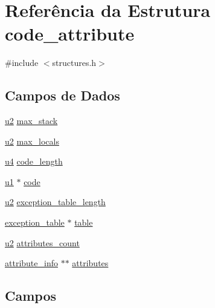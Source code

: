 \hypertarget{structcode__attribute}{}\section{Referência da Estrutura code\+\_\+attribute}
\label{structcode__attribute}


{\ttfamily \#include $<$structures.\+h$>$}

\subsection*{Campos de Dados}
\begin{DoxyCompactItemize}
\item 
\hyperlink{lista__operandos_8h_a732cde1300aafb73b0ea6c2558a7a54f}{u2} \hyperlink{structcode__attribute_abd4d398c165a4e91f3ea559808931473}{max\+\_\+stack}
\item 
\hyperlink{lista__operandos_8h_a732cde1300aafb73b0ea6c2558a7a54f}{u2} \hyperlink{structcode__attribute_ab75487f3c1d38f9fb6ad5e71ab99dea2}{max\+\_\+locals}
\item 
\hyperlink{lista__operandos_8h_ae5be1f726785414dd1b77d60df074c9d}{u4} \hyperlink{structcode__attribute_a8c2176f2e2a92747fd2920fde5992b43}{code\+\_\+length}
\item 
\hyperlink{lista__operandos_8h_ad9f4cdb6757615aae2fad89dab3c5470}{u1} $\ast$ \hyperlink{structcode__attribute_a72ecf2f84184325965481ecbc8d997cd}{code}
\item 
\hyperlink{lista__operandos_8h_a732cde1300aafb73b0ea6c2558a7a54f}{u2} \hyperlink{structcode__attribute_ab84a776a1bdeb79fde3b47279d8e12e4}{exception\+\_\+table\+\_\+length}
\item 
\hyperlink{structexception__table}{exception\+\_\+table} $\ast$ \hyperlink{structcode__attribute_a8bdff0149755249696a5d6aa288d7a98}{table}
\item 
\hyperlink{lista__operandos_8h_a732cde1300aafb73b0ea6c2558a7a54f}{u2} \hyperlink{structcode__attribute_a7c0a342c05fa196324b0806f6704916b}{attributes\+\_\+count}
\item 
\hyperlink{structattribute__info}{attribute\+\_\+info} $\ast$$\ast$ \hyperlink{structcode__attribute_a6e986c701d34b14f33959e35606b46ed}{attributes}
\end{DoxyCompactItemize}


\subsection{Campos}
